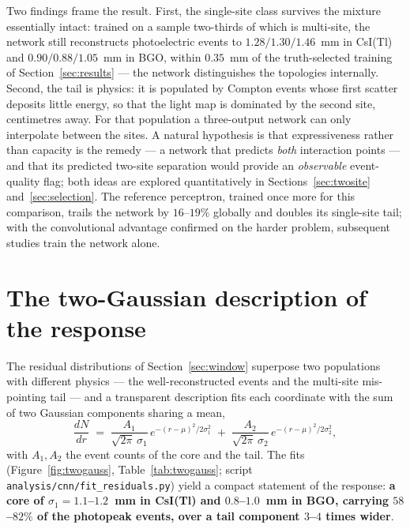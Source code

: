 \documentclass[11pt,a4paper]{article}
\newcommand{\code}[1]{\texttt{#1}}
\newcommand{\csitl}{CsI(Tl)}
\begin{document}
Two findings frame the result. First, the single-site class survives the
mixture essentially intact: trained on a sample two-thirds of which is
multi-site, the network still reconstructs photoelectric events to
$1.28/1.30/1.46$~mm in \csitl{} and $0.90/0.88/1.05$~mm in BGO, within
$0.35$~mm of the truth-selected training of Section~\ref{sec:results} --- the
network distinguishes the topologies internally. Second, the tail is physics:
it is populated by Compton events whose first scatter deposits little energy,
so that the light map is dominated by the second site, centimetres away. For
that population a three-output network can only interpolate between the sites.
A natural hypothesis is that expressiveness rather than capacity is the
remedy --- a network that predicts \emph{both} interaction points ---
and that its predicted two-site separation would provide an \emph{observable}
event-quality flag; both ideas are explored quantitatively in
Sections~\ref{sec:twosite} and~\ref{sec:selection}. The
reference perceptron, trained once more for this comparison, trails the
network by $16$--$19\%$ globally and doubles its single-site tail; with the
convolutional advantage confirmed on the harder problem, subsequent studies
train the network alone.

\section{The two-Gaussian description of the response}
\label{sec:twogauss}

The residual distributions of Section~\ref{sec:window} superpose two
populations with different physics --- the well-reconstructed events and the
multi-site mis-pointing tail --- and a transparent description fits each
coordinate with the sum of two Gaussian components sharing a mean,
\begin{equation}
  \frac{dN}{dr} \;=\; \frac{A_1}{\sqrt{2\pi}\,\sigma_1}
  \, e^{-(r-\mu)^2/2\sigma_1^2}
  \;+\; \frac{A_2}{\sqrt{2\pi}\,\sigma_2}\, e^{-(r-\mu)^2/2\sigma_2^2},
\end{equation}
with $A_1, A_2$ the event counts of the core and the tail. The fits
(Figure~\ref{fig:twogauss}, Table~\ref{tab:twogauss}; script
\code{analysis/cnn/fit\_residuals.py}) yield a compact statement of the
response: \textbf{a core of $\sigma_1 = 1.1$--$1.2$~mm in \csitl{} and
$0.8$--$1.0$~mm in BGO, carrying $58$--$82\%$ of the photopeak events,
over a tail component $3$--$4$ times wider}.
\end{document}
